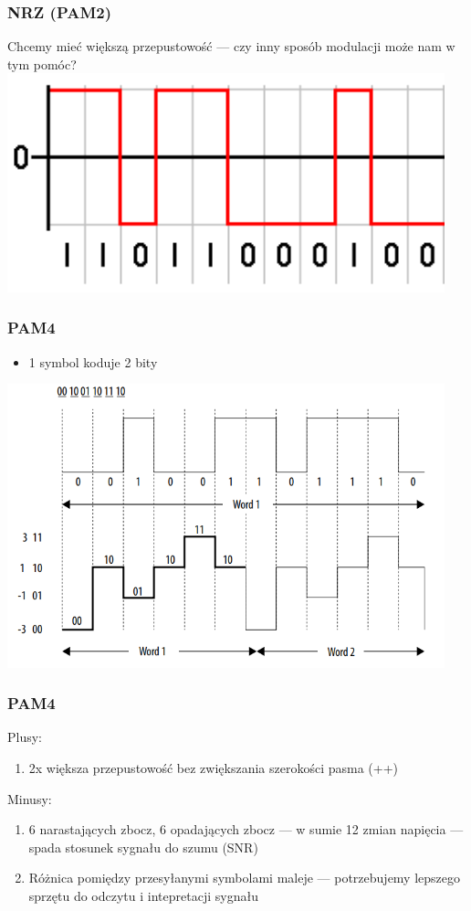 \documentclass{beamer}
\begin{document}
\begin{frame}
\frametitle{NRZ (PAM2)}
Chcemy mieć większą przepustowość --- czy inny sposób modulacji może nam w tym pomóc?
\includegraphics[width=0.95\textwidth]{images/nrz_code.png}
\end{frame}

\begin{frame}
\frametitle{PAM4}
\begin{itemize}
    \item 1 symbol koduje 2 bity
\end{itemize}
\includegraphics[width=0.95\textwidth]{images/pam4_vs_nrz.png}
\end{frame}

\begin{frame}
\frametitle{PAM4}
Plusy:
\begin{enumerate}
    \item 2x większa przepustowość bez zwiększania szerokości pasma (++)
\end{enumerate}

Minusy:
\begin{enumerate}
    \item 6 narastających zbocz, 6 opadających zbocz --- w sumie 12 zmian napięcia --- spada stosunek sygnału do szumu (SNR)
    \item Różnica pomiędzy przesyłanymi symbolami maleje --- potrzebujemy lepszego sprzętu do odczytu i intepretacji sygnału
\end{enumerate}
\end{frame}
\end{document}
